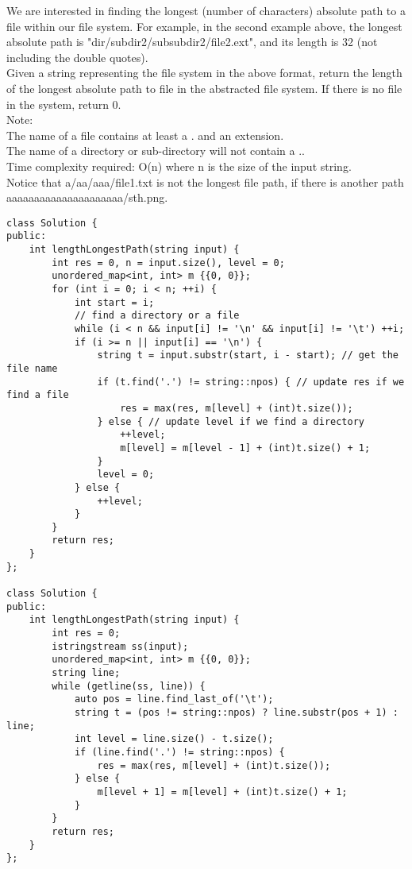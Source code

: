 We are interested in finding the longest (number of characters) absolute path to a file within our file system. For example, in the second example above, the longest absolute path is "dir/subdir2/subsubdir2/file2.ext", and its length is 32 (not including the double quotes).\\

Given a string representing the file system in the above format, return the length of the longest absolute path to file in the abstracted file system. If there is no file in the system, return 0.\\

Note:\\
    The name of a file contains at least a . and an extension.\\
    The name of a directory or sub-directory will not contain a ..\\
Time complexity required: O(n) where n is the size of the input string.\\
Notice that a/aa/aaa/file1.txt is not the longest file path, if there is another path \\
aaaaaaaaaaaaaaaaaaaaa/sth.png.\\

\begin{lstlisting}
class Solution {
public:
    int lengthLongestPath(string input) {
        int res = 0, n = input.size(), level = 0;
        unordered_map<int, int> m {{0, 0}};
        for (int i = 0; i < n; ++i) {
            int start = i;
            // find a directory or a file
            while (i < n && input[i] != '\n' && input[i] != '\t') ++i;
            if (i >= n || input[i] == '\n') {
                string t = input.substr(start, i - start); // get the file name
                if (t.find('.') != string::npos) { // update res if we find a file
                    res = max(res, m[level] + (int)t.size());
                } else { // update level if we find a directory
                    ++level;
                    m[level] = m[level - 1] + (int)t.size() + 1;
                }
                level = 0;
            } else {
                ++level;
            }
        }
        return res;
    }
};

class Solution {
public:
    int lengthLongestPath(string input) {
        int res = 0;
        istringstream ss(input);
        unordered_map<int, int> m {{0, 0}};
        string line;
        while (getline(ss, line)) {
            auto pos = line.find_last_of('\t');
            string t = (pos != string::npos) ? line.substr(pos + 1) : line;
            int level = line.size() - t.size();
            if (line.find('.') != string::npos) {
                res = max(res, m[level] + (int)t.size());
            } else {
                m[level + 1] = m[level] + (int)t.size() + 1;
            }
        }
        return res;
    }
};
\end{lstlisting}


